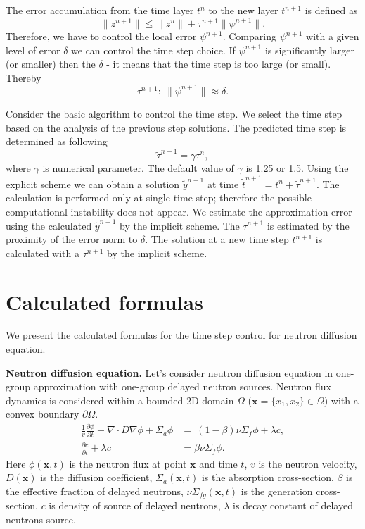 \documentclass[runningheads]{llncs}
\begin{document}
The error accumulation from the time layer $t^n$ to the new layer $t^{n+1}$  is defined as
\begin{equation}\label{8}
\|z^{n+1}\| \leq \|z^{n}\| + \tau^{n+1} \|\psi^{n+1}\| .
\end{equation}
Therefore, we have to control the local error $\psi^{n+1}$. Comparing $\psi^{n+1}$ with a given level of error $\delta$ we can control the time step choice. If $\psi^{n+1}$ is significantly larger (or smaller) then the $\delta$ - it means that the time step is too large (or small). Thereby
\begin{equation}\label{9}
  \tau^{n+1}: \ \|\psi^{n+1}\| \approx \delta .
\end{equation} 

Consider the basic algorithm to control the time step. We select the time step based on the analysis of the previous step solutions. The predicted time step is determined as following
\begin{equation}
 \widetilde{\tau}^{n+1} = \gamma \tau^n , 
\end{equation}
where $\gamma$ is numerical parameter. The default value of $\gamma$ is 1.25 or 1.5. Using the explicit scheme we can obtain a solution $\widetilde{y}^{n+1}$ at time $\widetilde{t}^{n+1} = t^n + \widetilde{\tau}^{n+1}$. The calculation is performed only at single time step;  therefore the possible computational instability does not appear.
We estimate the approximation error using the calculated $\widetilde{y}^{n+1}$ by the implicit scheme. The $\tau^{n+1}$ is estimated by the proximity of the error norm to $\delta$. The solution at a new time step $t^{n+1}$ is calculated with a $\tau^{n+1}$  by the implicit scheme.

\section{Calculated formulas}
We present the calculated formulas for the time step control for neutron diffusion equation.

\textbf{Neutron diffusion equation.}
Let's consider neutron diffusion equation in one-group approximation with one-group delayed neutron sources. Neutron flux dynamics is considered within a bounded 2D domain  $\Omega$ ($\bm x = \{x_1, x_2\} \in \Omega$) with a convex boundary $\partial \Omega$.
 \begin{equation}\label{11}
\begin{split}
 \frac{1}{v} \frac{\partial \phi}{\partial t} -  \nabla \cdot D \nabla \phi + \Sigma_{a} \phi &=   \ (1-\beta) \nu \Sigma_{f} \phi + \lambda c, \\
\frac{\partial c}{\partial t} + \lambda c &= \beta \nu \Sigma_{f} \phi.
\end{split}
\end{equation} 
Here $\phi(\bm x,t)$ is the neutron flux at point $\bm x$ and time $t$,
$v$ is the neutron velocity,
$D(\bm x)$ is the diffusion coefficient, 
$\Sigma_{a}(\bm x,t)$ is the absorption cross-section,
$\beta$ is the effective fraction of delayed neutrons, 
$\nu\Sigma_{fg}(\bm x,t)$ is the generation cross-section,
$c$ is density of source of delayed neutrons, 
$\lambda$  is decay constant of delayed neutrons source.
\end{document}
